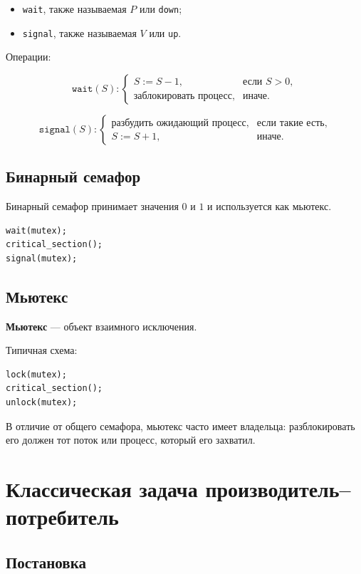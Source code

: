\documentclass[12pt,a4paper]{article}
\begin{document}
\begin{itemize}
    \item \texttt{wait}, также называемая $P$ или \texttt{down};
    \item \texttt{signal}, также называемая $V$ или \texttt{up}.
\end{itemize}

Операции:

\[
\texttt{wait}(S):
\begin{cases}
S := S - 1, & \text{если } S > 0,\\
\text{заблокировать процесс}, & \text{иначе.}
\end{cases}
\]

\[
\texttt{signal}(S):
\begin{cases}
\text{разбудить ожидающий процесс}, & \text{если такие есть},\\
S := S + 1, & \text{иначе.}
\end{cases}
\]

\subsection{Бинарный семафор}

Бинарный семафор принимает значения $0$ и $1$ и используется как мьютекс.

\begin{lstlisting}
wait(mutex);
critical_section();
signal(mutex);
\end{lstlisting}

\subsection{Мьютекс}

\textbf{Мьютекс} --- объект взаимного исключения.

Типичная схема:

\begin{lstlisting}
lock(mutex);
critical_section();
unlock(mutex);
\end{lstlisting}

В отличие от общего семафора, мьютекс часто имеет владельца: разблокировать его должен тот поток или процесс, который его захватил.

\section{Классическая задача производитель--потребитель}

\subsection{Постановка}
\end{document}
